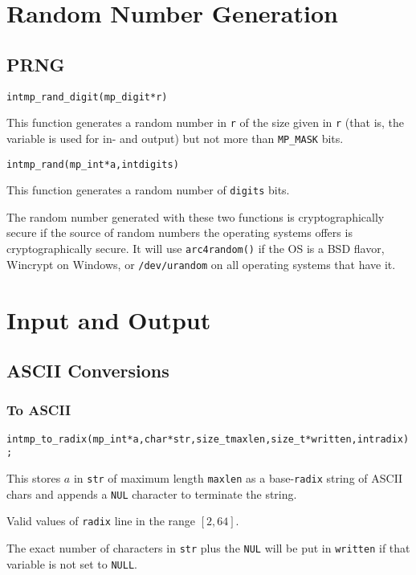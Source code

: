\documentclass[synpaper]{book}
\begin{document}
\chapter{Random Number Generation}
\section{PRNG}
\begin{alltt}
int mp_rand_digit(mp_digit *r)
\end{alltt}
This function generates a random number in \texttt{r} of the size given in \texttt{r} (that is, the variable is used for in- and output) but not more than \texttt{MP\_MASK} bits.

\begin{alltt}
int mp_rand(mp_int *a, int digits)
\end{alltt}
This function generates a random number of \texttt{digits} bits.

The random number generated with these two functions is cryptographically secure if the source of random numbers the operating systems offers is cryptographically secure. It will use \texttt{arc4random()} if the OS is a BSD flavor, Wincrypt on Windows, or \texttt{/dev/urandom} on all operating systems that have it.


\chapter{Input and Output}
\section{ASCII Conversions}
\subsection{To ASCII}
\begin{alltt}
int mp_to_radix (mp_int *a, char *str, size_t maxlen, size_t *written, int radix);
\end{alltt}
This stores $a$ in \texttt{str} of maximum length \texttt{maxlen} as a base-\texttt{radix} string of ASCII chars and appends a \texttt{NUL} character to terminate the string.

Valid values of \texttt{radix} line in the range $[2, 64]$.

The exact number of characters in \texttt{str} plus the \texttt{NUL} will be put in \texttt{written} if that variable is not set to \texttt{NULL}.
\end{document}
